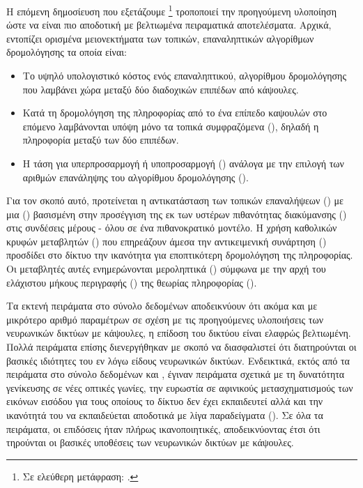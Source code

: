 \subsubsection{}
Η επόμενη δημοσίευση που εξετάζουμε \footnote{Σε ελεύθερη μετάφραση: .}\cite{de2020introducing} τροποποιεί την προηγούμενη υλοποίηση ώστε να είναι πιο αποδοτική με βελτιωμένα πειραματικά αποτελέσματα. Αρχικά, εντοπίζει ορισμένα μειονεκτήματα των τοπικών, επαναληπτικών αλγορίθμων δρομολόγησης τα οποία είναι:
\begin{itemize}
    \item Το υψηλό υπολογιστικό κόστος ενός επαναληπτικού, αλγορίθμου δρομολόγησης που λαμβάνει χώρα μεταξύ δύο διαδοχικών επιπέδων από κάψουλες.
    \item Κατά τη δρομολόγηση της πληροφορίας από το ένα επίπεδο καψουλών στο επόμενο λαμβάνονται υπόψη μόνο τα τοπικά συμφραζόμενα (), δηλαδή η πληροφορία μεταξύ των δύο επιπέδων.
    \item Η τάση για υπερπροσαρμογή ή υποπροσαρμογή () ανάλογα με την επιλογή των αριθμών επανάληψης του αλγορίθμου δρομολόγησης ().
\end{itemize}
Για τον σκοπό αυτό, προτείνεται η αντικατάσταση των τοπικών επαναλήψεων () με μια  () βασισμένη στην προσέγγιση της εκ των υστέρων πιθανότητας διακύμανσης () στις συνδέσεις μέρους - όλου σε ένα πιθανοκρατικό μοντέλο. Η χρήση καθολικών κρυφών μεταβλητών () που επηρεάζουν άμεσα την αντικειμενική συνάρτηση () προσδίδει στο δίκτυο την ικανότητα για εποπτικότερη δρομολόγηση της πληροφορίας. Οι μεταβλητές αυτές ενημερώνονται μεροληπτικά () σύμφωνα με την αρχή του ελάχιστου μήκους περιγραφής () της θεωρίας πληροφορίας ().\par

Τα εκτενή πειράματα στο σύνολο δεδομένων  αποδεικνύουν ότι ακόμα και με μικρότερο αριθμό παραμέτρων σε σχέση με τις προηγούμενες υλοποιήσεις των νευρωνικών δικτύων με κάψουλες, η επίδοση του δικτύου είναι ελαφρώς βελτιωμένη. Πολλά πειράματα επίσης διενεργήθηκαν με σκοπό να διασφαλιστεί ότι διατηρούνται οι βασικές ιδιότητες του εν λόγω είδους νευρωνικών δικτύων. Ενδεικτικά, εκτός από τα πειράματα στο σύνολο δεδομένων  και , έγιναν πειράματα σχετικά με τη δυνατότητα γενίκευσης σε νέες οπτικές γωνίες, την ευρωστία σε αφινικούς μετασχηματισμούς των εικόνων εισόδου για τους οποίους το δίκτυο δεν έχει εκπαιδευτεί αλλά και την ικανότητά του να εκπαιδεύεται αποδοτικά με λίγα παραδείγματα (). Σε όλα τα πειράματα, οι επιδόσεις ήταν πλήρως ικανοποιητικές, αποδεικνύοντας έτσι ότι τηρούνται οι βασικές υποθέσεις των νευρωνικών δικτύων με κάψουλες. 

